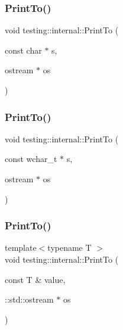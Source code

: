 \mbox{\label{namespacetesting_1_1internal_adc6c98306d40b53fd07be4e295102a0a}} 
\subsubsection{\texorpdfstring{Print\+To()}{PrintTo()}\hspace{0.1cm}{\footnotesize\ttfamily [2/20]}}
{\footnotesize\ttfamily void testing\+::internal\+::\+Print\+To (\begin{DoxyParamCaption}\item[{const char $\ast$}]{s,  }\item[{ostream $\ast$}]{os }\end{DoxyParamCaption})}

\mbox{\label{namespacetesting_1_1internal_afc20fb56b2547a8f91f9ff99650f2024}} 
\subsubsection{\texorpdfstring{Print\+To()}{PrintTo()}\hspace{0.1cm}{\footnotesize\ttfamily [3/20]}}
{\footnotesize\ttfamily void testing\+::internal\+::\+Print\+To (\begin{DoxyParamCaption}\item[{const wchar\+\_\+t $\ast$}]{s,  }\item[{ostream $\ast$}]{os }\end{DoxyParamCaption})}

\mbox{\label{namespacetesting_1_1internal_adb3c27150dbe661db0e0c4be27533460}} 
\subsubsection{\texorpdfstring{Print\+To()}{PrintTo()}\hspace{0.1cm}{\footnotesize\ttfamily [4/20]}}
{\footnotesize\ttfamily template$<$typename T $>$ \\
void testing\+::internal\+::\+Print\+To (\begin{DoxyParamCaption}\item[{const T \&}]{value,  }\item[{\+::std\+::ostream $\ast$}]{os }\end{DoxyParamCaption})}

